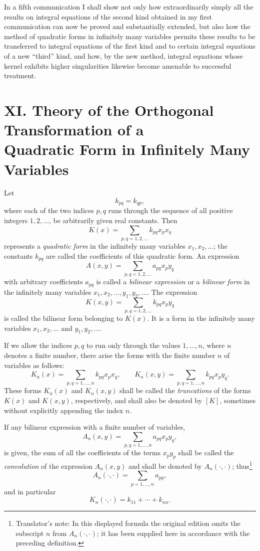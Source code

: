 \documentclass[b5paper,twoside]{article}
\newcommand{\originalpage}[1]{\phantomsection\label{origpage:#1}}
\begin{document}
In a fifth communication I shall show not only how extraordinarily simply all
the results on integral equations of the second kind obtained in my first
communication can now be proved and substantially extended, but also how the
method of quadratic forms in infinitely many variables permits these results
to be \mbox{transferred} to integral equations of the first kind and to certain
integral equations of a new ``third'' kind, and how, by the new method,
integral equations whose kernel exhibits higher singularities likewise become
amenable to successful treatment.

\section*{XI. Theory of the Orthogonal Transformation of a\\
Quadratic Form in Infinitely Many Variables}
\label{sec:XI}

Let
\[
  k_{pq}=k_{qp},
\]
where each of the two indices $p,q$ runs through the sequence of all positive
integers $1,2,\ldots$, be arbitrarily given real constants.  Then
\[
  K(x)=\sum_{p,q=1,2,\ldots} k_{pq}x_p x_q
\]
represents a \emph{quadratic form} in the infinitely many variables
$x_1,x_2,\ldots$; the constants $k_{pq}$ are called the coefficients of this
quadratic form.  An expression
\[
  A(x,y)=\sum_{p,q=1,2,\ldots} a_{pq}x_p y_q
\]
with arbitrary coefficients $a_{pq}$ is called a \emph{bilinear expression}
or a \emph{bilinear form} in the infinitely many variables
$x_1,x_2,\ldots,y_1,y_2,\ldots$.  The expression
\[
  K(x,y)=\sum_{p,q=1,2,\ldots} k_{pq}x_p y_q
\]
is called the bilinear form belonging to $K(x)$.  It is a form in the
infinitely many variables $x_1,x_2,\ldots$ and $y_1,y_2,\ldots$.

If we allow the indices $p,q$ to run only through the values $1,\ldots,n$,
where $n$ denotes a finite number, there arise\originalpage{159} the forms
with the finite number $n$ of variables as follows:
\[
  K_n(x)=\sum_{p,q=1,\ldots,n}k_{pq}x_p x_q,
  \qquad
  K_n(x,y)=\sum_{p,q=1,\ldots,n}k_{pq}x_p y_q.
\]
These forms $K_n(x)$ and $K_n(x,y)$ shall be called the \emph{truncations} of
the forms $K(x)$ and $K(x,y)$, respectively, and shall also be denoted by
$[K]$, sometimes without explicitly appending the index $n$.

If any bilinear expression with a finite number of variables,
\[
  A_n(x,y)=\sum_{p,q=1,\ldots,n}a_{pq}x_p y_q,
\]
is given, the sum of all the coefficients of the terms $x_p y_p$ shall be
called the \emph{convolution} of the expression $A_n(x,y)$ and shall be
denoted by $A_n(\mathord{\cdot},\mathord{\cdot})$; thus\footnote{Translator's
note: In this displayed formula the original edition omits the subscript $n$
from $A_n(\mathord{\cdot},\mathord{\cdot})$; it has been supplied here in
accordance with the preceding definition.}
\[
  A_n(\mathord{\cdot},\mathord{\cdot})
  =\sum_{p=1,\ldots,n}a_{pp},
\]
and in particular
\[
  K_n(\mathord{\cdot},\mathord{\cdot})
  =k_{11}+\cdots+k_{nn}.
\]
\end{document}
